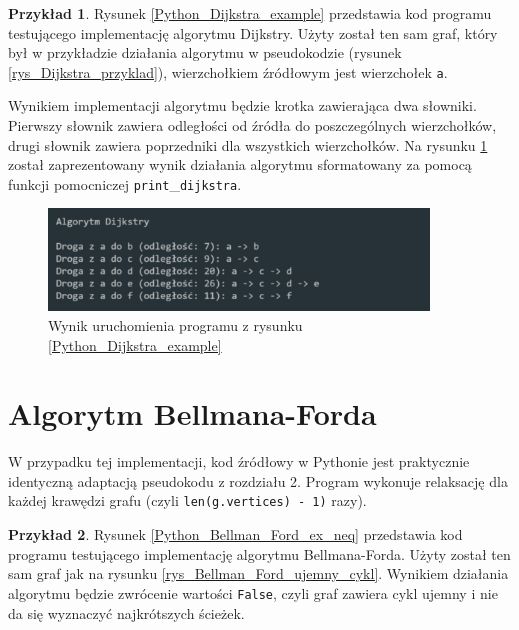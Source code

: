\documentclass[12pt,a4paper]{book}
\theoremstyle{definition}
\newtheorem{ex}{Przykład}
\numberwithin{equation}{chapter}
\begin{document}
\begin{ex}
Rysunek \ref{Python_Dijkstra_example} przedstawia kod programu testującego implementację algorytmu Dijkstry. Użyty został ten sam graf, który był w przykładzie działania algorytmu w pseudokodzie (rysunek \ref{rys_Dijkstra_przyklad}), wierzchołkiem źródłowym jest wierzchołek \texttt{a}.



Wynikiem implementacji algorytmu będzie krotka zawierająca dwa słowniki. Pierwszy słownik zawiera odległości od źródła do poszczególnych wierzchołków, drugi słownik zawiera poprzedniki dla wszystkich wierzchołków. Na rysunku \ref{rys_wynik_dijkstra} został zaprezentowany wynik działania algorytmu sformatowany za pomocą funkcji pomocniczej \texttt{print}\_\texttt{dijkstra}.

\begin{figure}[!htp]
\centering
\includegraphics[width=0.9\textwidth]{images/dijkstra_example.pdf}
\caption{Wynik uruchomienia programu z rysunku \ref{Python_Dijkstra_example}}
\label{rys_wynik_dijkstra}
\end{figure}

\end{ex}

\section{Algorytm Bellmana-Forda}



W przypadku tej implementacji, kod źródłowy w Pythonie jest praktycznie identyczną adaptacją pseudokodu z rozdziału 2. Program wykonuje relaksację dla każdej krawędzi grafu (czyli \texttt{len(g.vertices) - 1)} razy).


\begin{ex}
Rysunek \ref{Python_Bellman_Ford_ex_neq} przedstawia kod programu testującego implementację algorytmu Bellmana-Forda. Użyty został ten sam graf jak na rysunku \ref{rys_Bellman_Ford_ujemny_cykl}. Wynikiem działania algorytmu będzie zwrócenie wartości \texttt{False}, czyli graf zawiera cykl ujemny i nie da się wyznaczyć najkrótszych ścieżek.


\end{ex}
\end{document}
